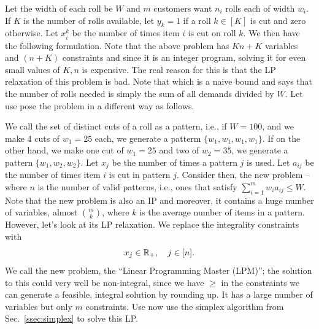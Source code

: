 \documentclass[letterpaper, 10pt, twocolumn, reqno]{amsart}
\begin{document}
Let the width of each roll be $W$ and $m$ customers want $n_i$ rolls each of width $w_i$. If $K$ is the number of rolls available, let $y_k = 1$ if a roll $k \in [K]$ is cut and zero otherwise. Let $x_i^k$ be the number of times item $i$ is cut on roll $k$. We then have the following formulation.
Note that the above problem has $Kn + K$ variables and $(n+K)$ constraints and since it is an integer program, solving it for even small values of $K, n$ is expensive. The real reason for this is that the LP relaxation of this problem is bad. Note that
which is a naive bound and says that the number of rolls needed is simply the sum of all demands divided by $W$. Let use pose the problem in a different way as follows.

We call the set of distinct cuts of a roll as a pattern, i.e., if $W=100$, and we make 4 cuts of $w_1 = 25$ each, we generate a patterm $\{ w_1, w_1, w_1, w_1 \}$. If on the other hand, we make one cut of $w_1 =25$ and two of $w_2 = 35$, we generate a pattern $\{ w_1, w_2, w_2 \}$. Let $x_j$ be the number of times a pattern $j$ is used. Let $a_{ij}$ be the number of times item $i$ is cut in pattern $j$. Consider then, the new problem --
where $n$ is the number of valid patterns, i.e., ones that satisfy $\sum_{i=1}^m w_i a_{ij} \leq W$. Note that the new problem is also an IP and moreover, it contains a huge number of variables, almost $m \choose k$, where $k$ is the average number of items in a pattern. However, let's look at its LP relaxation. We replace the integrality constraints with
$$
x_j \in \mathbb{R}_+,\quad j \in [n].
$$
We call the new problem, the ``Linear Programming Master (LPM)''; the solution to this could very well be non-integral, since we have $\geq$ in the constraints we can generate a feasible, integral solution by rounding up. It has a large number of variables but only $m$ constraints. Use now use the simplex algorithm from Sec.~\ref{ssec:simplex} to solve this LP.
\end{document}
